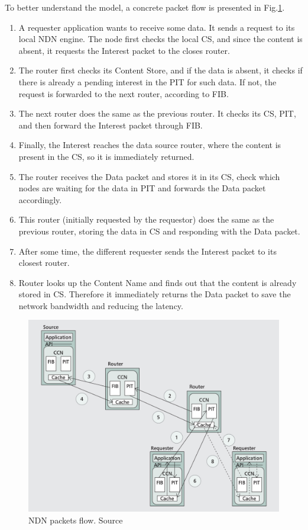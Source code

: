 To better understand the model, a concrete packet flow is presented in Fig.\ref{fig:ndn-flow}. 
\begin{enumerate}
    \item A requester application wants to receive some data. It sends a request to its local NDN engine. The node first checks the local CS, and since the content is absent, it requests the Interest packet to the closes router.
    \item The router first checks its Content Store, and if the data is absent, it checks if there is already a pending interest in the PIT for such data. If not, the request is forwarded to the next router, according to FIB.  
    \item The next router does the same as the previous router. It checks its CS, PIT, and then forward the Interest packet through FIB.
    \item Finally, the Interest reaches the data source router, where the content is present in the CS, so it is immediately returned.
    \item The router receives the Data packet and stores it in its CS, check which nodes are waiting for the data in PIT and forwards the Data packet accordingly.
    \item This router (initially requested by the requestor) does the same as the previous router, storing the data in CS and responding with the Data packet.
    \item After some time, the different requester sends the Interest packet to its closest router.
    \item Router looks up the Content Name and finds out that the content is already stored in CS. Therefore it immediately returns the Data packet to save the network bandwidth and reducing the latency.
\end{enumerate}

\begin{figure}[h]
    \centering
    \includegraphics[width=\linewidth]{img/ndn-flow.png}
    \caption{NDN packets flow. Source \cite{ahlgren2012survey}}
    \label{fig:ndn-flow}
\end{figure}